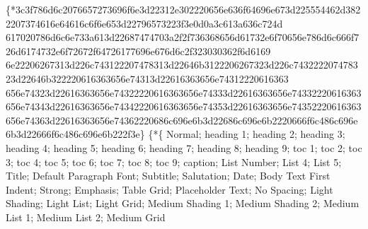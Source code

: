 \{* 3c3f786d6c2076657273696f6e3d22312e302220656e636f64696e673d225554462d3822207374616e64616c6f6e653d22796573223f3e0d0a3c613a636c724d
617020786d6c6e733a613d22687474703a2f2f736368656d61732e6f70656e786d6c666f726d6174732e6f72672f64726177696e676d6c2f323030362f6d6169
6e22206267313d226c743122207478313d22646b3122206267323d226c743222207478323d22646b322220616363656e74313d22616363656e74312220616363
656e74323d22616363656e74322220616363656e74333d22616363656e74332220616363656e74343d22616363656e74342220616363656e74353d22616363656e74352220616363656e74363d22616363656e74362220686c696e6b3d22686c696e6b2220666f6c486c696e6b3d22666f6c486c696e6b222f3e\}
\{*\latentstyles{}\{\lsdlockedexcept {}
 Normal;  heading 1;
    heading
2;    heading
3;    heading 4;
    heading
5;    heading
6;    heading 7;
    heading
8;    heading
9; toc 1; toc 2; toc
3; toc 4; toc 5;  toc
6; toc 7; toc 8; toc
9;   
caption;   List
Number;   List 4;
   List 5;
 Title; Default Paragraph Font;
 Subtitle;  
Salutation;   
Date;   Body Text First
Indent;  Strong; 
Emphasis; Table Grid;  
Placeholder Text;   No
Spacing;  Light Shading;
 Light List;  Light Grid;
  Medium Shading 1; 
Medium Shading 2;  Medium List 1;
 Medium List 2;  Medium Grid
